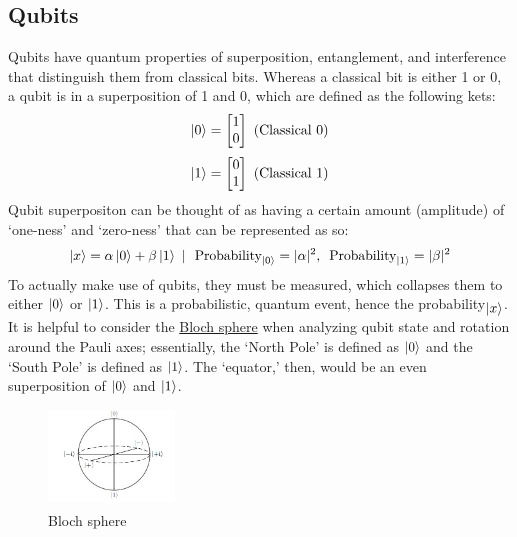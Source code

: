 \documentclass[12pt]{article}
\begin{document}
\subsection{Qubits}
Qubits have quantum properties of superposition, entanglement, and interference that distinguish them from classical bits. Whereas a classical bit is either 1 or 0, a qubit is in a superposition of 1 and 0, which are defined as the following kets:
$$ \ket{0} = \begin{bmatrix} 1 \\ 0 \end{bmatrix} \text{ (Classical 0)} $$
$$ \ket{1} = \begin{bmatrix} 0 \\ 1 \end{bmatrix} \text{ (Classical 1)} $$
Qubit superpositon can be thought of as having a certain amount (amplitude) of `one-ness' and `zero-ness' that can be represented as so:
$$ \ket{x} = \alpha \ket{0} + \beta \ket{1} \ | \ \text{ Probability}_{\ket{0}} = | \alpha |^2 \text{, } \text{ Probability}_{\ket{1}} = | \beta |^2 $$
To actually make use of qubits, they must be measured, which collapses them to either $\ket{0}$ or $\ket{1}$. This is a probabilistic, quantum event, hence the probability\textsubscript{$\ket{x}$}. It is helpful to consider the \hyperref[fig:bsphere]{Bloch sphere} when analyzing qubit state and rotation around the Pauli axes; essentially, the `North Pole' is defined as $\ket{0}$ and the `South Pole' is defined as $\ket{1}$. The `equator,' then, would be an even superposition of $\ket{0}$ and $\ket{1}$.

\begin{figure}[H]
    \centering
    \capstart
    \includegraphics[width=0.3\textwidth]{images/bloch_sphere.png}
    \caption{Bloch sphere\textsuperscript{\cite{wikipedia_2021}}}
    \label{fig:bsphere}
\end{figure}
\end{document}
